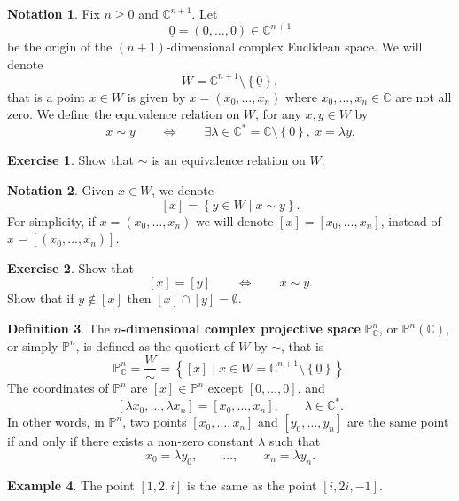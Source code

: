 \documentclass{article}
\newcommand{\C}{\mathbb{C}}
\renewcommand{\P}{\mathbb{P}}
\newcommand{\rb}[1]{\left( #1 \right)}
\renewcommand{\sb}[1]{\left[ #1 \right]}
\newcommand{\cb}[1]{\left\{ #1 \right\}}
\theoremstyle{definition}\newtheorem{definition}{Definition}[section]
\theoremstyle{definition}\newtheorem{notation}[definition]{Notation}
\theoremstyle{definition}\newtheorem{remark}[definition]{Remark}
\theoremstyle{definition}\newtheorem{example1}[definition]{Example}
\theoremstyle{definition}\newtheorem{fact}{Fact}
\theoremstyle{definition}\newtheorem{exercise}{Exercise}
\theoremstyle{definition}\newtheorem*{example2}{Example}
\begin{document}
\begin{notation}
Fix $ n \ge 0 $ and $ \C^{n + 1} $. Let
$$ \underline{0} = \rb{0, \dots, 0} \in \C^{n + 1} $$
be the origin of the $ \rb{n + 1} $-dimensional complex Euclidean space. We will denote
$$ W = \C^{n + 1} \setminus \cb{\underline{0}}, $$
that is a point $ x \in W $ is given by $ x = \rb{x_0, \dots, x_n} $ where $ x_0, \dots, x_n \in \C $ are not all zero. We define the equivalence relation on $ W $, for any $ x, y \in W $ by
$$ x \sim y \qquad \iff \qquad \exists \lambda \in \C^* = \C \setminus \cb{0}, \ x = \lambda y. $$
\end{notation}

\begin{exercise}
Show that $ \sim $ is an equivalence relation on $ W $.
\end{exercise}

\begin{notation}
Given $ x \in W $, we denote
$$ \sb{x} = \cb{y \in W \mid x \sim y}. $$
For simplicity, if $ x = \rb{x_0, \dots, x_n} $ we will denote $ \sb{x} = \sb{x_0, \dots, x_n} $, instead of $ x = \sb{\rb{x_0, \dots, x_n}} $.
\end{notation}

\begin{exercise}
Show that
$$ \sb{x} = \sb{y} \qquad \iff \qquad x \sim y. $$
Show that if $ y \notin \sb{x} $ then $ \sb{x} \cap \sb{y} = \emptyset $.
\end{exercise}

\begin{definition}
The \textbf{$ n $-dimensional complex projective space} $ \P_\C^n $, or $ \P^n\rb{\C} $, or simply $ \P^n $, is defined as the quotient of $ W $ by $ \sim $, that is
$$ \P_\C^n = \dfrac{W}{\sim} = \cb{\sb{x} \mid x \in W = \C^{n + 1} \setminus \cb{\underline{0}}}. $$
The coordinates of $ \P^n $ are $ \sb{x} \in \P^n $ except $ \sb{0, \dots, 0} $, and
$$ \sb{\lambda x_0, \dots, \lambda x_n} = \sb{x_0, \dots, x_n}, \qquad \lambda \in \C^*. $$
In other words, in $ \P^n $, two points $ \sb{x_0, \dots, x_n} $ and $ \sb{y_0, \dots, y_n} $ are the same point if and only if there exists a non-zero constant $ \lambda $ such that
$$ x_0 = \lambda y_0, \qquad \dots, \qquad x_n = \lambda y_n. $$
\end{definition}

\begin{example1}
The point $ \sb{1, 2, i} $ is the same as the point $ \sb{i, 2i, -1} $.
\end{example1}
\end{document}
